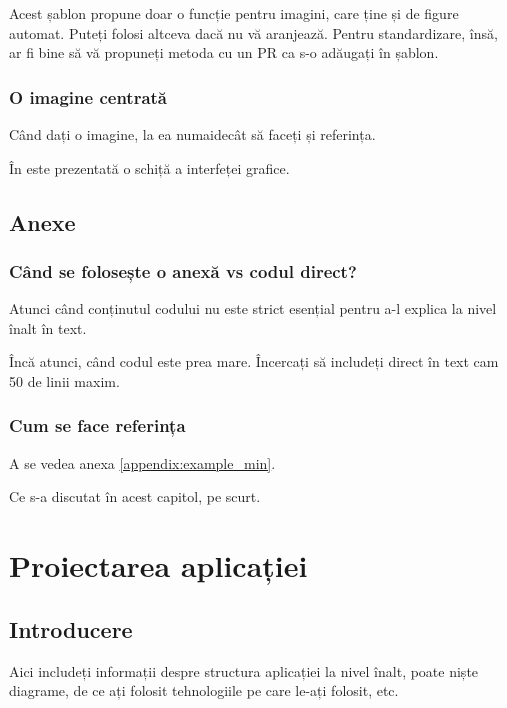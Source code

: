\documentclass[a4paper,12pt]{report}
\begin{document}
Acest șablon propune doar o funcție pentru imagini, care ține și de figure automat.
Puteți folosi altceva dacă nu vă aranjează.
Pentru standardizare, însă, ar fi bine să vă propuneți metoda cu un \ac{PR} ca s-o adăugați în șablon.

\subsection{O imagine centrată}

Când dați o imagine, la ea numaidecât să faceți și referința.

În  este prezentată o schiță a interfeței grafice.


\section{Anexe}

\subsection{Când se folosește o anexă vs codul direct?}

Atunci când conținutul codului nu este strict esențial 
pentru a-l explica la nivel înalt în text.

Încă atunci, când codul este prea mare. 
Încercați să includeți direct în text cam 50 de linii maxim.

\subsection{Cum se face referința}

A se vedea anexa \ref{appendix:example_min}.


Ce s-a discutat în acest capitol, pe scurt.


\chapter{Proiectarea aplicației}\label{architecture_chapter_title}

\section{Introducere}

Aici includeți informații despre structura aplicației la nivel înalt, 
poate niște diagrame, de ce ați folosit tehnologiile pe care le-ați folosit, etc.
\end{document}
